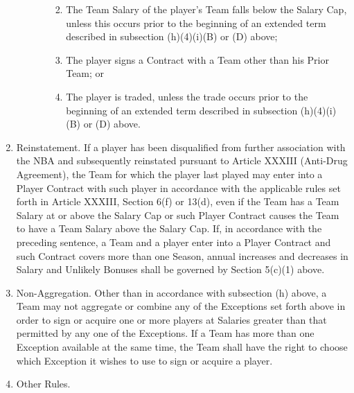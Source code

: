 \documentclass[
]{book}
\providecommand{\tightlist}{%
  \setlength{\itemsep}{0pt}\setlength{\parskip}{0pt}}
\begin{document}
\begin{enumerate}
\begin{enumerate}
\begin{enumerate}
      \begin{enumerate}
      \def\labelenumiv{(\Alph{enumiv})}
      \tightlist
      \item
        The Team Salary of the player's Team falls below the Salary Cap, unless this occurs prior to the beginning of an extended term described in subsection (h)(4)(i)(B) or (D) above;
      \item
        The player signs a Contract with a Team other than his Prior Team; or
      \item
        The player is traded, unless the trade occurs prior to the beginning of an extended term described in subsection (h)(4)(i)(B) or (D) above.
      \end{enumerate}
    \end{enumerate}
  \end{enumerate}
\item
  Reinstatement. If a player has been disqualified from further association with the NBA and subsequently reinstated pursuant to Article XXXIII (Anti-Drug Agreement), the Team for which the player last played may enter into a Player Contract with such player in accordance with the applicable rules set forth in Article XXXIII, Section 6(f) or 13(d), even if the Team has a Team Salary at or above the Salary Cap or such Player Contract causes the Team to have a Team Salary above the Salary Cap. If, in accordance with the preceding sentence, a Team and a player enter into a Player Contract and such Contract covers more than one Season, annual increases and decreases in Salary and Unlikely Bonuses shall be governed by Section 5(c)(1) above.
\item
  Non-Aggregation. Other than in accordance with subsection (h) above, a Team may not aggregate or combine any of the Exceptions set forth above in order to sign or acquire one or more players at Salaries greater than that permitted by any one of the Exceptions. If a Team has more than one Exception available at the same time, the Team shall have the right to choose which Exception it wishes to use to sign or acquire a player.
\item
  Other Rules.


\end{enumerate}
\end{document}
